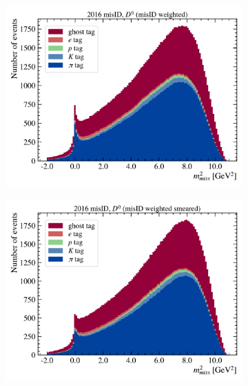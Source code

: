 \begin{figure}[!htb]
    \centering
    \begin{subfigure}[b]{0.32\textwidth}
        \centering
        \includegraphics[width=\textwidth]{figs-fit-fit-templates/data-driven-plots/misid/D0_mm2.pdf}
    \end{subfigure}
    \hfill
    \begin{subfigure}[b]{0.32\textwidth}
        \centering
        \includegraphics[width=\textwidth]{figs-fit-fit-templates/data-driven-plots/misid/D0_mm2_smr.pdf}
    \end{subfigure}

\end{figure}

